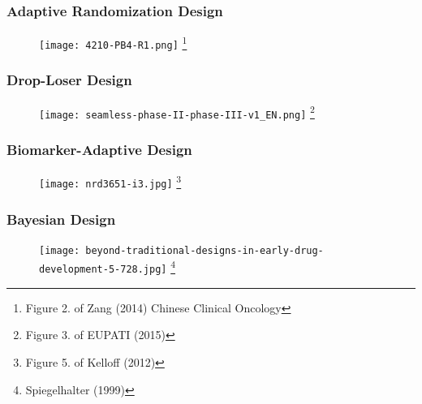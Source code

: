 \documentclass{beamer}
\begin{document}
\begin{frame}
	\frametitle{Adaptive Randomization Design}
	\begin{figure}
		\begin{center}
			\texttt{[image: 4210-PB4-R1.png]}
			\footnote[]{Figure 2. of Zang (2014) Chinese Clinical Oncology}
		\end{center}
	\end{figure}	
\end{frame}

\begin{frame}
	\frametitle{Drop-Loser Design}
	\begin{figure}
		\begin{center}
			\texttt{[image: seamless-phase-II-phase-III-v1\_EN.png]}
			\footnote[]{Figure 3. of EUPATI (2015)}
		\end{center}
	\end{figure}	
\end{frame}
\begin{frame}
	\frametitle{Biomarker-Adaptive Design}
	\begin{figure}
		\begin{center}
			\texttt{[image: nrd3651-i3.jpg]}
			\footnote[]{Figure 5. of Kelloff (2012)}
		\end{center}
	\end{figure}	
\end{frame}
\begin{frame}
	\frametitle{Bayesian Design}
	\begin{figure}
		\begin{center}
			\texttt{[image: beyond-traditional-designs-in-early-drug-development-5-728.jpg]}
			\footnote[]{Spiegelhalter (1999)}
		\end{center}
	\end{figure}
\end{frame}
%
%
%
%
\end{document}
